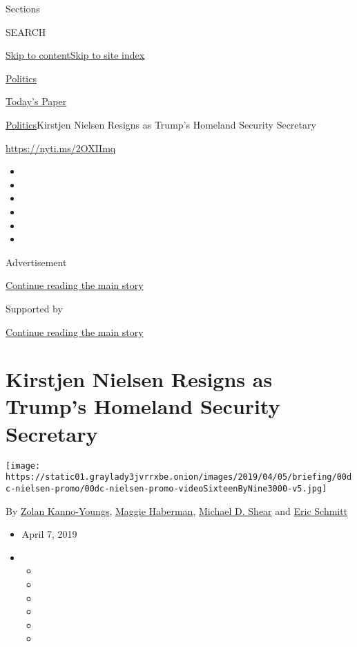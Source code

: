 Sections

SEARCH

\protect\hyperlink{site-content}{Skip to
content}\protect\hyperlink{site-index}{Skip to site index}

\href{https://www.nytimes3xbfgragh.onion/section/politics}{Politics}

\href{https://myaccount.nytimes3xbfgragh.onion/auth/login?response_type=cookie\&client_id=vi}{}

\href{https://www.nytimes3xbfgragh.onion/section/todayspaper}{Today's
Paper}

\href{/section/politics}{Politics}\textbar{}Kirstjen Nielsen Resigns as
Trump's Homeland Security Secretary

\url{https://nyti.ms/2OXIImq}

\begin{itemize}
\item
\item
\item
\item
\item
\item
\end{itemize}

Advertisement

\protect\hyperlink{after-top}{Continue reading the main story}

Supported by

\protect\hyperlink{after-sponsor}{Continue reading the main story}

\hypertarget{kirstjen-nielsen-resigns-as-trumps-homeland-security-secretary}{%
\section{Kirstjen Nielsen Resigns as Trump's Homeland Security
Secretary}\label{kirstjen-nielsen-resigns-as-trumps-homeland-security-secretary}}

\texttt{[image: https://static01.graylady3jvrrxbe.onion/images/2019/04/05/briefing/00dc-nielsen-promo/00dc-nielsen-promo-videoSixteenByNine3000-v5.jpg]}

By \href{https://www.nytimes3xbfgragh.onion/by/zolan-kanno-youngs}{Zolan
Kanno-Youngs},
\href{https://www.nytimes3xbfgragh.onion/by/maggie-haberman}{Maggie
Haberman},
\href{https://www.nytimes3xbfgragh.onion/by/michael-d-shear}{Michael D.
Shear} and
\href{https://www.nytimes3xbfgragh.onion/by/eric-schmitt}{Eric Schmitt}

\begin{itemize}
\item
  April 7, 2019
\item
  \begin{itemize}
  \item
  \item
  \item
  \item
  \item
  \item
  \end{itemize}
\end{itemize}

